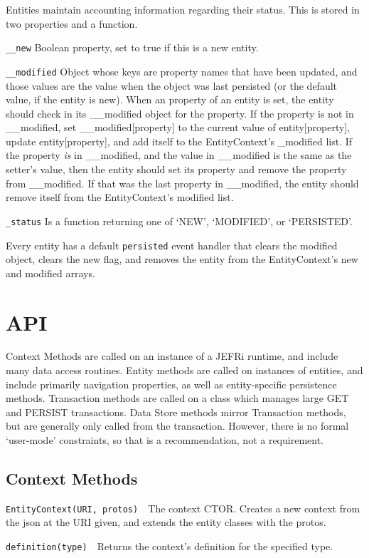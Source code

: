 \documentclass{article}
\begin{document}
Entities maintain accounting information regarding their status. This is stored
in two properties and a function.

{\tt \_\_new} Boolean property, set to true if this is a new entity.

{\tt \_\_modified} Object whose keys are property names that have been updated,
and those values are the value when the object was last persisted (or the
default value, if the entity is new). When an property of an entity is set, the
entity should check in its \_\_modified object for the property. If the property
is not in \_\_modified, set \_\_modified[property] to the current value of
entity[property], update entity[property], and add itself to the EntityContext's
\_modified list. If the property {\it  is} in
\_\_modified, and the value in \_\_modified is the same as the setter's value, then
the entity should set its property and remove the property from \_\_modified. If
that was the last property in \_\_modified, the entity should remove itself from
the EntityContext's modified list.

{\tt \_status} Is a function returning one of `NEW', `MODIFIED', or `PERSISTED'.

Every entity has a default {\tt persisted} event handler that clears the
modified object, clears the new flag, and removes the entity from the
EntityContext's new and modified arrays.

\section{API}
Context Methods are called on an instance of a JEFRi runtime, and include many
data access routines. Entity methods are called on instances of entities, and
include primarily navigation properties, as well as entity-specific persistence
methods. Transaction methods are called on a class which manages large GET and
PERSIST transactions. Data Store methods mirror Transaction methods, but
are generally only called from the transaction. However, there is no formal
`user-mode' constraints, so that is a recommendation, not a requirement.

\subsection{Context Methods}
	{\tt EntityContext(URI, protos) }\
		The context CTOR. Creates a new context from the json at the URI given,
		and extends the entity classes with the protos.

	{\tt definition(type) }\
		Returns the context's definition for the specified type.
\end{document}

